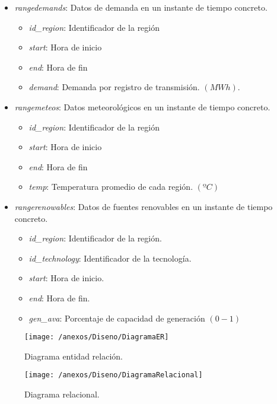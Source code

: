 \begin{itemize}
	\item \textit{rangedemands}: Datos de demanda en un instante de tiempo concreto.
	\begin{itemize}
		\item \textit{id\_region}: Identificador de la región
		\item \textit{start}: Hora de inicio
		\item \textit{end}: Hora de fin
		\item \textit{demand}: Demanda por registro de transmisión. $ (MWh) $.
	\end{itemize}
	
	\item \textit{rangemeteos}: Datos meteorológicos en un instante de tiempo concreto.
	\begin{itemize}
		\item \textit{id\_region}: Identificador de la región
		\item \textit{start}: Hora de inicio
		\item \textit{end}: Hora de fin
		\item \textit{temp}: Temperatura promedio de cada región. $ (ºC) $
	\end{itemize}
	
	\item \textit{rangerenowables}: Datos de fuentes renovables en un instante de tiempo concreto.
	\begin{itemize}
		\item \textit{id\_region}: Identificador de la región.
		\item \textit{id\_technology}: Identificador de la tecnología.
		\item \textit{start}: Hora de inicio.
		\item \textit{end}: Hora de fin.
		\item \textit{gen\_ava}: Porcentaje de capacidad de generación $ (0 - 1) $
	\end{itemize}

\end{itemize}

\begin{figure}[h]
	\centering
	\texttt{[image: /anexos/Diseno/DiagramaER]}
	\caption{Diagrama entidad relación.}
	\label{img:modeloER}
\end{figure}

\begin{figure}[h]
	\centering
	\texttt{[image: /anexos/Diseno/DiagramaRelacional]}
	\caption{Diagrama relacional.}
	\label{img:modeloRelacional}
\end{figure}



